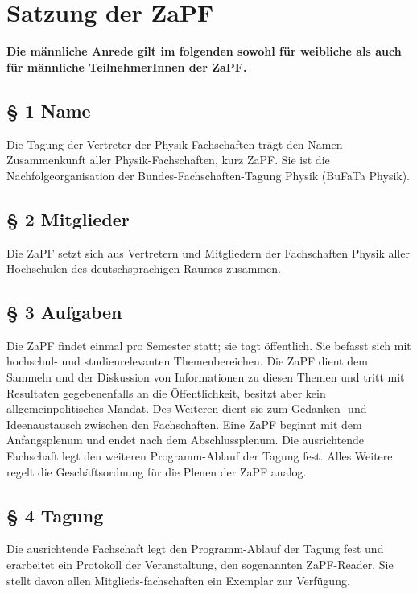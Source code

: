 



\chapter*{Satzung der ZaPF}

\textbf{Die männliche Anrede gilt im folgenden sowohl für weibliche
als auch für männliche
 TeilnehmerInnen der ZaPF.}

\section*{§ 1 Name}
Die Tagung der Vertreter der Physik-Fachschaften trägt den Namen
Zusammenkunft aller Physik-Fachschaften, kurz ZaPF. Sie ist die
Nachfolgeorganisation der Bundes-Fachschaften-Tagung Physik (BuFaTa
Physik).

\section*{§ 2 Mitglieder}
Die ZaPF setzt sich aus Vertretern und Mitgliedern der Fachschaften Physik aller Hochschulen
des deutschsprachigen Raumes zusammen.

\section*{§ 3 Aufgaben}
Die ZaPF findet einmal pro Semester statt; sie tagt öffentlich. Sie
befasst sich mit hochschul- und studienrelevanten Themenbereichen.
Die ZaPF dient dem Sammeln und der Diskussion von Informationen zu
diesen Themen und tritt mit Resultaten gegebenenfalls an die
Öffentlichkeit, besitzt aber kein allgemeinpolitisches Mandat. Des
Weiteren dient sie zum Gedanken- und Ideenaustausch zwischen den
Fachschaften. Eine ZaPF beginnt mit dem Anfangsplenum und endet nach
dem Abschlussplenum. Die ausrichtende Fachschaft legt den weiteren
Programm-Ablauf der Tagung fest. Alles Weitere regelt die
Geschäftsordnung für die Plenen der ZaPF analog.

\section*{§ 4 Tagung}
Die ausrichtende Fachschaft legt den Programm-Ablauf der Tagung fest und erarbeitet ein Protokoll der Veranstaltung,
den sogenannten ZaPF-Reader. Sie stellt davon allen Mitglieds-fachschaften ein Exemplar zur Verfügung.

\newpage
